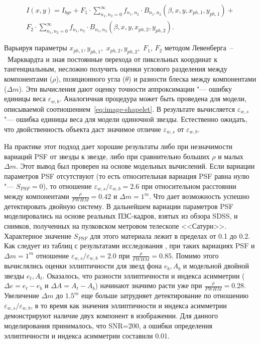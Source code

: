 \begin{align}\label{eq:binary-model}
I(x,y) = I_{bgr}+F_1\cdot\sum_{n_1,n_2=0}^{\infty}f_{n_1,n_2}\cdot B_{n_1,n_2}(\beta,x,y,x_{ph,1},y_{ph,1})+ \nonumber \\
F_2\cdot\sum_{n_1,n_2=0}^{\infty}f_{n_1,n_2}\cdot B_{n_1,n_2}(\beta,x,y,x_{ph,2},y_{ph,2}).
\end{align}

Варьируя параметры $x_{ph,1},y_{ph,1}$,~$x_{ph,2},y_{ph,2}$,~$F_1$, $F_2$ методом Левенберга~--~Марквардта и зная постоянные перехода от пиксельных координат к тангенциальным, несложно получить оценки углового разделения между компонентами ($\rho$), позиционного угла ($\theta$) и разности блеска между компонентами ($\Delta m$). Эти вычисления дают оценку точности аппроксимации "--- ошибку единицы веса $\varepsilon_{w,b}$. Аналогичная процедура может быть проведена для модели, описываемой соотношением~\ref{eq:image-shapelet}. В результате вычисляется $\varepsilon_{w,s}$ "--- ошибка единицы веса для модели одиночной звезды. Естественно ожидать, что двойственность объекта даст значимое отличие $\varepsilon_{w,s}$ от $\varepsilon_{w,b}$.

На практике этот подход дает хорошие результаты либо при незначимости вариаций PSF от звезды к звезде, либо при сравнительно больших $\rho$ и малых $\Delta m$. Этот вывод был проверен на основе модельных вычислений. Если вариации параметров PSF отсутствуют (то есть относительная вариация PSF равна нулю "---  $S_{PSF}=0$), то отношение $\varepsilon_{w,s}/\varepsilon_{w,b}=2.6$ при относительном расстоянии между компонентами $\frac{\rho}{FWHM}=0.42$ и $\Delta m = 1^m$. Что дает возможность успешно детектировать двойную систему. В дальнейшем вариации параметров PSF моделировались на основе реальных ПЗС-кадров, взятых из обзора SDSS, и снимков, полученных на пулковском метровом телескопе <<Сатурн>>. Характерное значение $S_{PSF}$ для этого материала лежит в пределах от 0.1 до 0.2. Как следует из таблиц с результатами исследования \cite{2018AstL...44..103K}, при таких вариациях PSF и $\Delta m = 1^m$ отношение $\varepsilon_{w,s}/\varepsilon_{w,b}=2.0$ при $\frac{\rho}{FWHM}=0.85$. Помимо этого вычислялись оценки эллиптичности для звезд фона $e_{b}, A_{b}$ и модельной двойной звезды $e_{t}, A_{t}$. Оказалось, что  разности эллиптичности и индекса асимметрии ($\Delta e=e_{t} - e_{b}$ и $\Delta A=A_{t} - A_{b}$) начинают значимо расти уже при $\frac{\rho}{FWHM}=0.28$. Увеличение $\Delta m $ до $1.5^m$ еще больше затрудняет детектирование по отношению $\varepsilon_{w,s}/\varepsilon_{w,b}$, в то время как значения эллиптичности и индекса асимметрии  демонстрируют наличие двух компонент в изображении. Для данного моделирования принималось, что SNR=200, а ошибки определения эллиптичности и индекса асимметрии составили 0.01.

